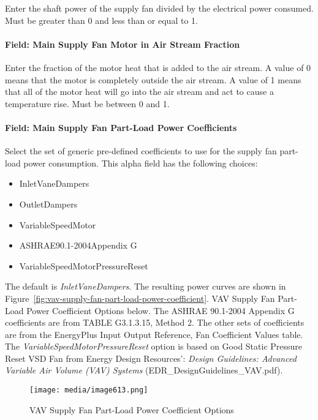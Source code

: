 Enter the shaft power of the supply fan divided by the electrical power consumed. Must be greater than 0 and less than or equal to 1.

\paragraph{Field: Main Supply Fan Motor in Air Stream Fraction}\label{field-main-supply-fan-motor-in-air-stream-fraction}

Enter the fraction of the motor heat that is added to the air stream. A value of 0 means that the motor is completely outside the air stream. A value of 1 means that all of the motor heat will go into the air stream and act to cause a temperature rise. Must be between 0 and 1.

\paragraph{Field: Main Supply Fan Part-Load Power Coefficients}\label{field-main-supply-fan-part-load-power-coefficients}

Select the set of generic pre-defined coefficients to use for the supply fan part-load power consumption. This alpha field has the following choices:

\begin{itemize}
\item
  InletVaneDampers
\item
  OutletDampers
\item
  VariableSpeedMotor
\item
  ASHRAE90.1-2004Appendix G
\item
  VariableSpeedMotorPressureReset
\end{itemize}

The default is \emph{InletVaneDampers}. The resulting power curves are shown in Figure~\ref{fig:vav-supply-fan-part-load-power-coefficient}. VAV Supply Fan Part-Load Power Coefficient Options below. The ASHRAE 90.1-2004 Appendix G coefficients are from TABLE G3.1.3.15, Method 2. The other sets of coefficients are from the EnergyPlus Input Output Reference, Fan Coefficient Values table. The \emph{VariableSpeedMotorPressureReset} option is based on Good Static Pressure Reset VSD Fan from Energy Design Resources': \emph{Design Guidelines: Advanced Variable Air Volume (VAV) Systems} (EDR\_DesignGuidelines\_VAV.pdf).

\begin{figure}[hbtp] %
\centering
\texttt{[image: media/image613.png]}
\caption{VAV Supply Fan Part-Load Power Coefficient Options \protect \label{fig:vav-supply-fan-part-load-power-coefficient-002}}
\end{figure}

